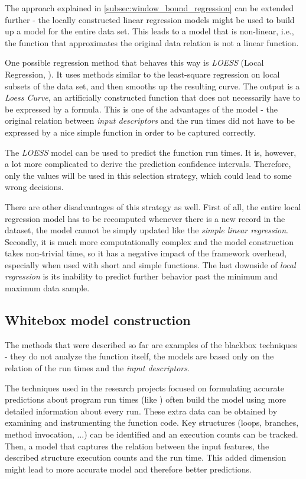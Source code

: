 The approach explained in \ref{subsec:window_bound_regression} can be extended further - the locally constructed linear regression models might be used to build up a model for the entire data set. This leads to a model that is non-linear, i.e., the function that approximates the original data relation is not a linear function.

One possible regression method that behaves this way is \textit{LOESS} (Local Regression, \cite{cleveland_locally_1988,cleveland_regression_1988,cleveland_computational_1991}). It uses methods similar to the least-square regression on local subsets of the data set, and then smooths up the resulting curve. The output is a \textit{Loess Curve}, an artificially constructed function that does not necessarily have to be expressed by a formula. This is one of the advantages of the model - the original relation between \textit{input descriptors} and the run times did not have to be expressed by a nice simple function in order to be captured correctly.

The \textit{LOESS} model can be used to predict the function run times. It is, however, a lot more complicated to derive the prediction confidence intervals. Therefore, only the values will be used in this selection strategy, which could lead to some wrong decisions.

There are other disadvantages of this strategy as well. First of all, the entire local regression model has to be recomputed whenever there is a new record in the dataset, the model cannot be simply updated like the \textit{simple linear regression}. Secondly, it is much more computationally complex and the model construction takes non-trivial time, so it has a negative impact of the framework overhead, especially when used with short and simple functions. The last downside of \textit{local regression} is its inability to predict further behavior past the minimum and maximum data sample.

\subsection{Whitebox model construction}

The methods that were described so far are examples of the blackbox techniques - they do not analyze the function itself, the models are based only on the relation of the run times and the \textit{input descriptors}. 

The techniques used in the research projects focused on formulating accurate predictions about program run times (like \cite{goldsmith_measuring_2007,chun_mantis:_2010,huang_predicting_2010}) often build the model using more detailed information about every run. These extra data can be obtained by examining and instrumenting the function code. Key structures (loops, branches, method invocation, ...) can be identified and an execution counts can be tracked. Then, a model that captures the relation between the input features, the described structure execution counts and the run time. This added dimension might lead to more accurate model and therefore better predictions.

